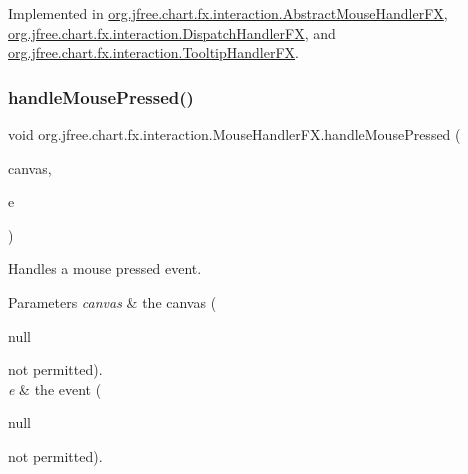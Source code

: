 Implemented in \mbox{\hyperlink{classorg_1_1jfree_1_1chart_1_1fx_1_1interaction_1_1_abstract_mouse_handler_f_x_a230992718e2106e928c8ea454d0d6a06}{org.\+jfree.\+chart.\+fx.\+interaction.\+Abstract\+Mouse\+Handler\+FX}}, \mbox{\hyperlink{classorg_1_1jfree_1_1chart_1_1fx_1_1interaction_1_1_dispatch_handler_f_x_a7509ebbee5de20b7cc4ad500cab4b488}{org.\+jfree.\+chart.\+fx.\+interaction.\+Dispatch\+Handler\+FX}}, and \mbox{\hyperlink{classorg_1_1jfree_1_1chart_1_1fx_1_1interaction_1_1_tooltip_handler_f_x_ae43d146d4ca535f1f1362ce4325ae41b}{org.\+jfree.\+chart.\+fx.\+interaction.\+Tooltip\+Handler\+FX}}.

\mbox{\label{interfaceorg_1_1jfree_1_1chart_1_1fx_1_1interaction_1_1_mouse_handler_f_x_a0cf92e5a448b58c199fc12dbdbd39aab}} 
\subsubsection{\texorpdfstring{handle\+Mouse\+Pressed()}{handleMousePressed()}}
{\footnotesize\ttfamily void org.\+jfree.\+chart.\+fx.\+interaction.\+Mouse\+Handler\+F\+X.\+handle\+Mouse\+Pressed (\begin{DoxyParamCaption}\item[{\mbox{\hyperlink{classorg_1_1jfree_1_1chart_1_1fx_1_1_chart_canvas}{Chart\+Canvas}}}]{canvas,  }\item[{Mouse\+Event}]{e }\end{DoxyParamCaption})}

Handles a mouse pressed event.


\begin{DoxyParams}{Parameters}
{\em canvas} & the canvas (
\begin{DoxyCode}
null 
\end{DoxyCode}
 not permitted). \\
\hline
{\em e} & the event (
\begin{DoxyCode}
null 
\end{DoxyCode}
 not permitted). \\
\hline
\end{DoxyParams}


